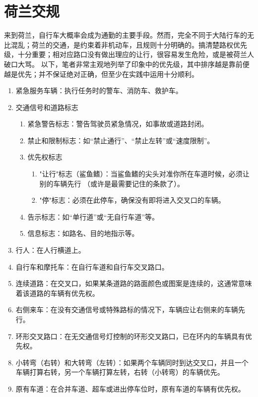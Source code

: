 \section{荷兰交规}
来到荷兰，自行车大概率会成为通勤的主要手段。然而，完全不同于大陆行车的无比混乱；荷兰的交通，是约束着非机动车，且规则十分明确的。搞清楚路权优先级，十分重要；相对应路口没有做出理应的让行，很容易发生危险，或是被荷兰人破口大骂。 以下，笔者非常主观地列举了印象中的优先级，其中排序越是靠前便越是优先；并不保证绝对正确，但至少在实践中运用十分顺利。

\begin{enumerate}
\item 紧急服务车辆：执行任务时的警车、消防车、救护车。
\item 交通信号和道路标志
\begin{enumerate}
    \item 紧急警告标志：警告驾驶员紧急情况，如事故或道路封闭。
    \item 禁止和限制标志：如“禁止通行”、“禁止左转”或“速度限制”。
    \item 优先权标志
    \begin{enumerate}
        \item "让行"标志（鲨鱼鳍）：当鲨鱼鳍的尖头对准你所在车道时候，必须让别的车辆先行 （或许是最需要记住的条款了）。
        \item "停"标志：必须在此停车，确保没有即将进入交叉口的车辆。
    \end{enumerate}
    \item 告示标志：如“单行道”或“无自行车道”等。
    \item 信息标志：如路名、目的地指示等。
\end{enumerate}
\item 行人：在人行横道上。
\item 自行车和摩托车：在自行车道和自行车交叉路口。
\item 连续道路：在交叉口，如果某条道路的路面颜色或图案是连续的，这通常意味着该道路的车辆有优先权。
\item 右侧来车：在没有交通信号或特殊路标的情况下，车辆应让右侧来的车辆先行。
\item 环形交叉路口：在无交通信号灯控制的环形交叉路口，已在环内的车辆具有优先权。
\item 小转弯（右转）和大转弯（左转）：如果两个车辆同时到达交叉口，并且一个车辆打算右转，另一个车辆打算左转，右转（小转弯）的车辆优先。
\item 原有车道：在合并车道、超车或进出停车位时，原有车道的车辆有优先权。
\end{enumerate}

